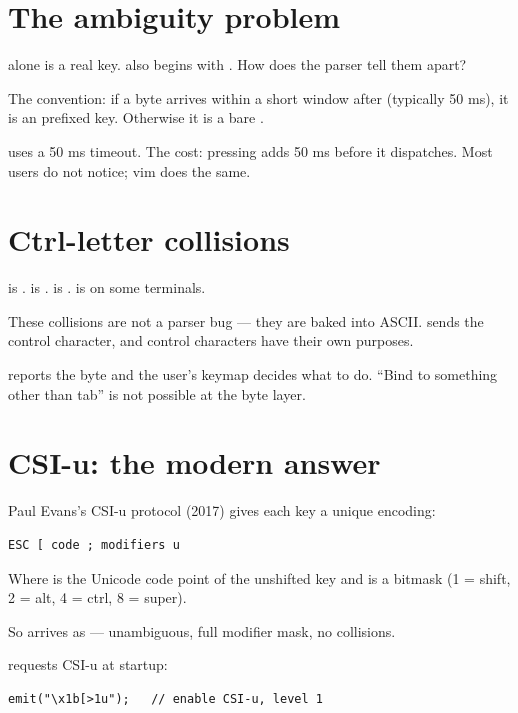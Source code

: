 \section{The ambiguity problem}

 alone is a real key.  also begins with
. How does the parser tell them apart?

The convention: if a byte arrives within a short window after
 (typically 50 ms), it is an prefixed key.
Otherwise it is a bare .

\maya{} uses a 50 ms timeout. The cost: pressing  adds
50 ms before it dispatches. Most users do not notice; vim does
the same.

\section{Ctrl-letter collisions}

 is .  is .
\code{Ctrl-[} is .  is 
on some terminals.

These collisions are not a parser bug --- they are baked into
ASCII.  sends the control character, and
control characters have their own purposes.

\maya{} reports the byte and the user's keymap decides what to
do. ``Bind  to something other than tab'' is not
possible at the byte layer.

\section{CSI-u: the modern answer}

Paul Evans's CSI-u protocol (2017) gives each key a unique
encoding:

\begin{lstlisting}
ESC [ code ; modifiers u
\end{lstlisting}

Where  is the Unicode code point of the unshifted
key and  is a bitmask (1 = shift, 2 = alt,
4 = ctrl, 8 = super).

So  arrives as \code{ESC [ 107 ; 5 u} ---
unambiguous, full modifier mask, no collisions.

\maya{} requests CSI-u at startup:

\begin{lstlisting}
emit("\x1b[>1u");   // enable CSI-u, level 1
\end{lstlisting}

